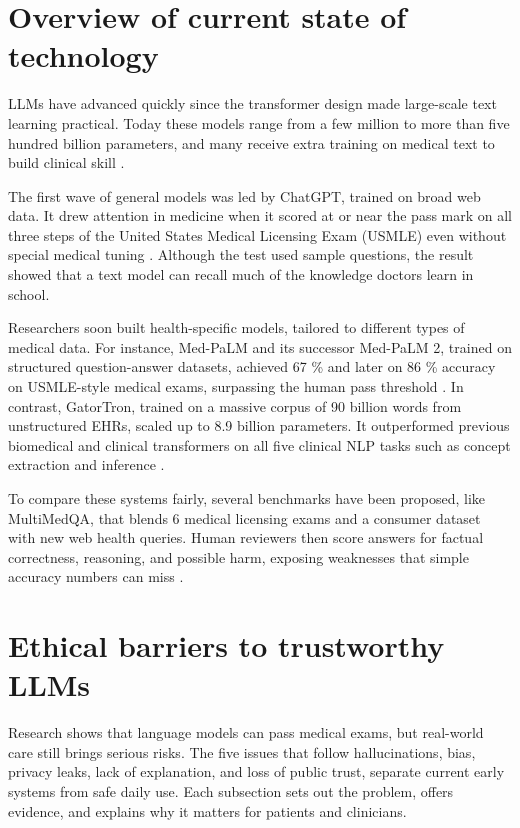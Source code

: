\documentclass[12pt,a4paper]{scrreprt}
\begin{document}
\section*{Overview of current state of technology}
LLMs have advanced quickly since the transformer design made large-scale text learning practical. Today these models range from a few million to more than five hundred billion parameters, and many receive extra training on medical text to build clinical skill \autocite{Survey}.\par
\vspace{\baselineskip}
\noindent
The first wave of general models was led by ChatGPT, trained on broad web data. It drew attention in medicine when it scored at or near the pass mark on all three steps of the United States Medical Licensing Exam (USMLE) even without special medical tuning \autocite{ChatGPT}. Although the test used sample questions, the result showed that a text model can recall much of the knowledge doctors learn in school.\par
\vspace{\baselineskip}
\noindent
Researchers soon built health-specific models, tailored to different types of medical data. For instance, Med-PaLM and its successor Med-PaLM 2, trained on structured question-answer datasets, achieved 67 \% and later on 86 \% accuracy on USMLE-style medical exams, surpassing the human pass threshold \autocite{MedPalm}. In contrast, GatorTron, trained on a massive corpus of 90 billion words from unstructured EHRs, scaled up to 8.9 billion parameters. It outperformed previous biomedical and clinical transformers on all five clinical NLP tasks such as concept extraction and inference \autocite{LLM}.\par
\vspace{\baselineskip}
\noindent
To compare these systems fairly, several benchmarks have been proposed, like MultiMedQA, that blends 6 medical licensing exams and a consumer dataset with new web health queries. Human reviewers then score answers for factual correctness, reasoning, and possible harm, exposing weaknesses that simple accuracy numbers can miss \autocite{LLM2}.

\section*{Ethical barriers to trustworthy LLMs}
Research shows that language models can pass medical exams, but real-world care still brings serious risks. The five issues that follow hallucinations, bias, privacy leaks, lack of explanation, and loss of public trust, separate current early systems from safe daily use. Each subsection sets out the problem, offers evidence, and explains why it matters for patients and clinicians.
\end{document}
